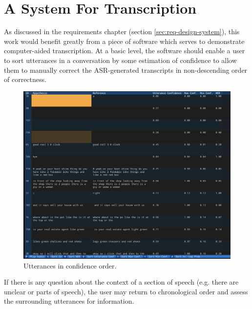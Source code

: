 \section{A System For Transcription}

As discussed in the requirements chapter (section \ref{sec:req-design-system}), this work would benefit greatly from a piece of software which serves to demonstrate computer-aided transcription.
At a basic level, the software should enable a user to sort utterances in a conversation by some estimation of confidence to allow them to manually correct the ASR-generated transcripts in non-descending order of correctness.

\begin{figure}[H]
  \centering
  \includegraphics[width=\textwidth]{images/confidence-order.png}
  \caption{Utterances in confidence order.}
  \label{fig:sys-confidence}
\end{figure}

If there is any question about the context of a section of speech (e.g. there are unclear or  parts of speech), the user may return to chronological order and assess the surrounding utterances for information.

